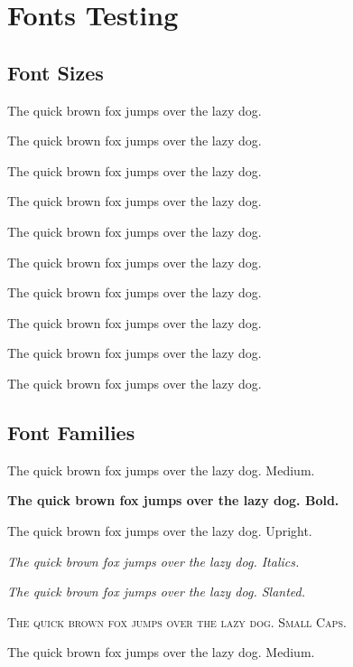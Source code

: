 \blinddocument

\chapter{Fonts Testing}

\section{Font Sizes}

{\tiny The quick brown fox jumps over the lazy dog.}

{\scriptsize The quick brown fox jumps over the lazy dog.}

{\footnotesize The quick brown fox jumps over the lazy dog.}

{\small The quick brown fox jumps over the lazy dog.}

{\normalsize The quick brown fox jumps over the lazy dog.}

{\large The quick brown fox jumps over the lazy dog.}

{\Large The quick brown fox jumps over the lazy dog.}

{\LARGE The quick brown fox jumps over the lazy dog.}

{\huge The quick brown fox jumps over the lazy dog.}

{\Huge The quick brown fox jumps over the lazy dog.}


\section{Font Families}

\sffamily\blindtext

\textmd{The quick brown fox jumps over the lazy dog. Medium.}

\textbf{The quick brown fox jumps over the lazy dog. Bold.}

\textup{The quick brown fox jumps over the lazy dog. Upright.}

\textit{The quick brown fox jumps over the lazy dog. Italics.}

\textsl{The quick brown fox jumps over the lazy dog. Slanted.}

\textsc{The quick brown fox jumps over the lazy dog. Small Caps.}

\ttfamily\blindtext

\textmd{The quick brown fox jumps over the lazy dog. Medium.}

